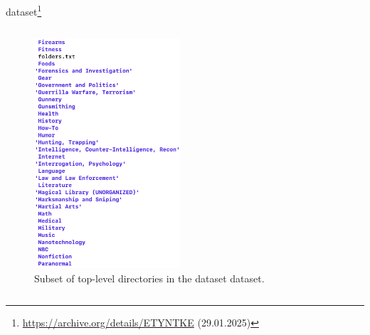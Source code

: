 \begin{frame}{\ac{dataset}\footnote{\url{https://archive.org/details/ETYNTKE} (29.01.2025)}}
\begin{columns}[T]
        \begin{column}{0.25\textwidth}
            \begin{figure}
                \includegraphics[width=\linewidth]{images/screenshot_data.png}
                \caption{Subset of top-level directories in the \ac{dataset} dataset.} %
            \end{figure}
   
        \end{column}
    \end{columns}
\end{frame}
